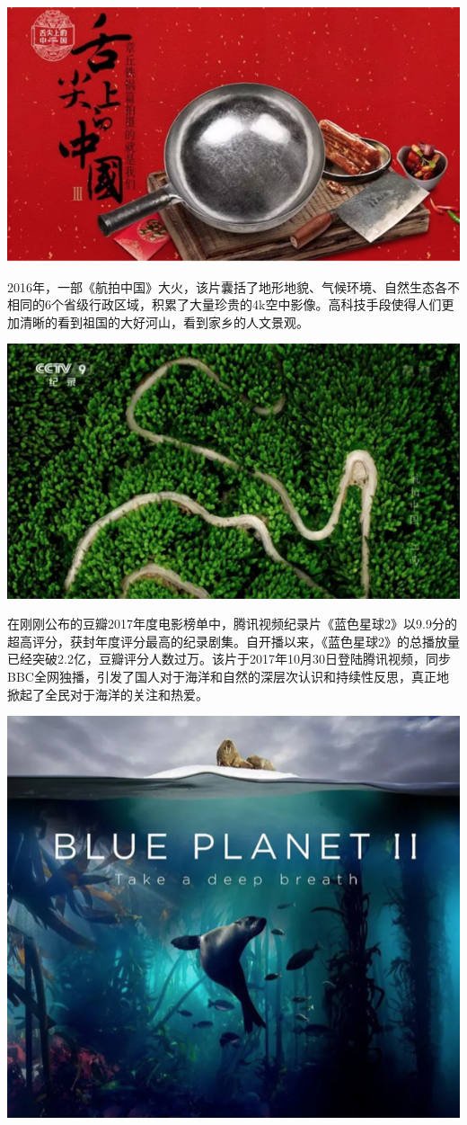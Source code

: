 \documentclass[]{book}
\begin{document}
\includegraphics[width=8.33in]{images/xf2}

2016年，一部《航拍中国》大火，该片囊括了地形地貌、气候环境、自然生态各不相同的6个省级行政区域，积累了大量珍贵的4k空中影像。高科技手段使得人们更加清晰的看到祖国的大好河山，看到家乡的人文景观。

\includegraphics[width=8.33in]{images/xf3}

在刚刚公布的豆瓣2017年度电影榜单中，腾讯视频纪录片《蓝色星球2》以9.9分的超高评分，获封年度评分最高的纪录剧集。自开播以来，《蓝色星球2》的总播放量已经突破2.2亿，豆瓣评分人数过万。该片于2017年10月30日登陆腾讯视频，同步BBC全网独播，引发了国人对于海洋和自然的深层次认识和持续性反思，真正地掀起了全民对于海洋的关注和热爱。

\includegraphics[width=8.33in]{images/xf4}
\end{document}
